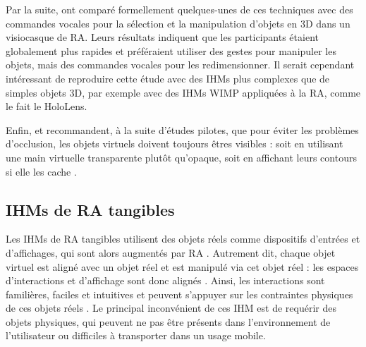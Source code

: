 
Par la suite, \cite{Piumsomboon2014} ont comparé formellement quelques-unes de ces techniques avec des commandes vocales pour la sélection et la manipulation d'objets en 3D dans un visiocasque de RA. Leurs résultats indiquent que les participants étaient globalement plus rapides et préféraient utiliser des gestes pour manipuler les objets, mais des commandes vocales pour les redimensionner. Il serait cependant intéressant de reproduire cette étude avec des IHMs plus complexes que de simples objets 3D, par exemple avec des IHMs WIMP appliquées à la RA, comme le fait le HoloLens.


Enfin, \cite{Piumsomboon2013} et \cite{Piumsomboon2014} recommandent, à la suite d'études pilotes, que pour éviter les problèmes d'occlusion, les objets virtuels doivent toujours êtres visibles : soit en utilisant une main virtuelle transparente plutôt qu'opaque, soit en affichant leurs contours si elle les cache .


\subsection{IHMs de RA tangibles}
\label{subsec:litterature_ar_hci_tui}

Les IHMs de RA tangibles utilisent des objets réels comme dispositifs d'entrées et d'affichages, qui sont alors augmentés par RA \citep{Kato2000}. Autrement dit, chaque objet virtuel est aligné avec un objet réel et est manipulé via cet objet réel \citep{Billinghurst2005} : les espaces d'interactions et d'affichage sont donc alignés \citep[p. 170]{Billinghurst2015}. Ainsi, les interactions sont familières, faciles et intuitives et peuvent s'appuyer sur les contraintes physiques de ces objets réels \citep{Zhou2008}. Le principal inconvénient de ces IHM est de requérir des objets physiques, qui peuvent ne pas être présents dans l'environnement de l'utilisateur ou difficiles à transporter dans un usage mobile.

